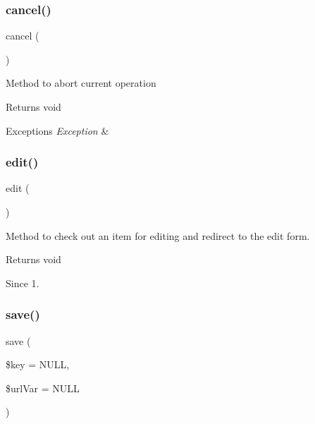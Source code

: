 \subsubsection{cancel()}
{\footnotesize\ttfamily cancel (\begin{DoxyParamCaption}{ }\end{DoxyParamCaption})}

Method to abort current operation

\begin{DoxyReturn}{Returns}
void
\end{DoxyReturn}

\begin{DoxyExceptions}{Exceptions}
{\em Exception} & \\
\hline
\end{DoxyExceptions}
\mbox{\label{classtks__agenda_controller_item_edit_form_a5cb75cbb16467eb1768837d126dc535b}} 
\subsubsection{edit()}
{\footnotesize\ttfamily edit (\begin{DoxyParamCaption}{ }\end{DoxyParamCaption})}

Method to check out an item for editing and redirect to the edit form.

\begin{DoxyReturn}{Returns}
void
\end{DoxyReturn}
\begin{DoxySince}{Since}
1. 
\end{DoxySince}
\mbox{\label{classtks__agenda_controller_item_edit_form_ac00855ace03b6824b4e1bdc9060ebab0}} 
\subsubsection{save()}
{\footnotesize\ttfamily save (\begin{DoxyParamCaption}\item[{}]{\$key = {\ttfamily NULL},  }\item[{}]{\$url\+Var = {\ttfamily NULL} }\end{DoxyParamCaption})}

